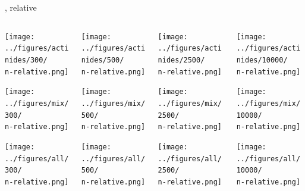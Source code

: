 \documentclass[
	11pt, %
	aspectratio=169, %
]{beamer}
\begin{document}
{\begin{frame}{\n, relative}
	\begin{columns}[c] %
		\begin{column}{0.25\textwidth} %
			\texttt{[image: ../figures/actinides/300/\\n-relative.png]}

			\texttt{[image: ../figures/mix/300/\\n-relative.png]}

			\texttt{[image: ../figures/all/300/\\n-relative.png]}
		\end{column}
		\begin{column}{0.25\textwidth} %
			\texttt{[image: ../figures/actinides/500/\\n-relative.png]}

			\texttt{[image: ../figures/mix/500/\\n-relative.png]}

			\texttt{[image: ../figures/all/500/\\n-relative.png]}
		\end{column}
		\begin{column}{0.25\textwidth} %
			\texttt{[image: ../figures/actinides/2500/\\n-relative.png]}

			\texttt{[image: ../figures/mix/2500/\\n-relative.png]}

			\texttt{[image: ../figures/all/2500/\\n-relative.png]}
		\end{column}
		\begin{column}{0.25\textwidth} %
			\texttt{[image: ../figures/actinides/10000/\\n-relative.png]}

			\texttt{[image: ../figures/mix/10000/\\n-relative.png]}

			\texttt{[image: ../figures/all/10000/\\n-relative.png]}
		\end{column}
	\end{columns}
\end{frame}

}
\end{document}
